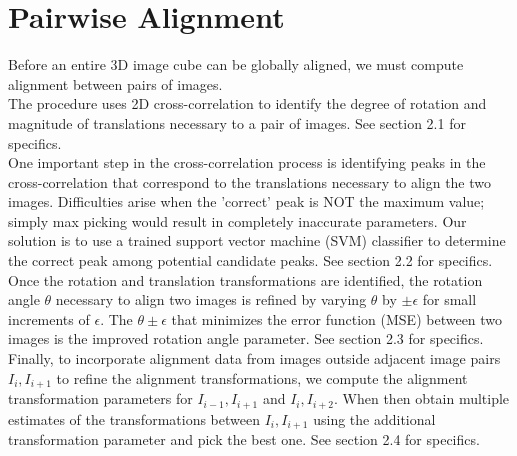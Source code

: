 \documentclass{article}
\begin{document}
\section{Pairwise Alignment}
Before an entire 3D image cube can be globally aligned, we must compute alignment between pairs of images.
\\
The procedure uses 2D cross-correlation to identify the degree of rotation and magnitude of translations necessary to a pair of images. See section 2.1 for specifics. 
\\
One important step in the cross-correlation process is identifying peaks in the cross-correlation that correspond to the translations necessary to align the two images. Difficulties arise when the 'correct' peak is NOT the maximum value; simply max picking would result in completely inaccurate parameters. Our solution is to use a trained support vector machine (SVM) classifier to determine the correct peak among potential candidate peaks. See section 2.2 for specifics. 
\\
Once the rotation and translation transformations are identified, the rotation angle $\theta$ necessary to align two images is refined by varying $\theta$ by $\pm \epsilon$ for small increments of $\epsilon$. The $\theta \pm \epsilon$ that minimizes the error function (MSE) between two images is the improved rotation angle parameter. See section 2.3 for specifics.
\\
Finally, to incorporate alignment data from images outside adjacent image pairs $I_i, I_{i+1}$ to refine the alignment transformations, we compute the alignment transformation parameters for $I_{i-1}, I_{i+1}$ and $I_i, I_{i+2}$. When then obtain multiple estimates of the transformations between $I_i, I_{i+1}$ using the additional transformation parameter and pick the best one. See section 2.4 for specifics.
\end{document}
